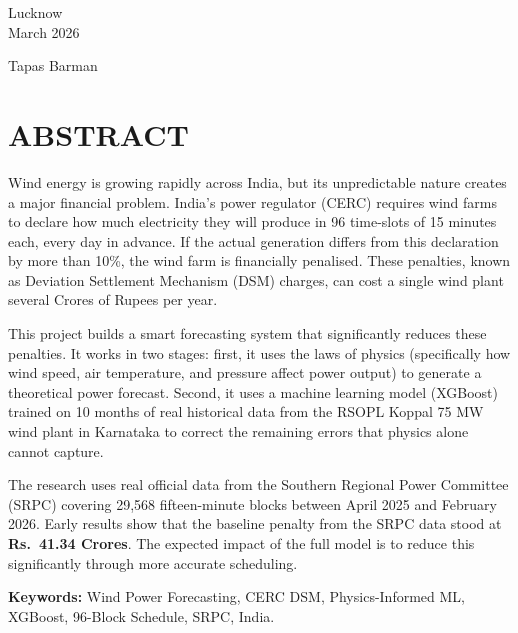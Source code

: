 \documentclass[12pt,a4paper]{report}
\begin{document}
\vfill

\noindent
\begin{minipage}[t]{0.48\textwidth}
    Lucknow\\
    March 2026
\end{minipage}
\hfill
\begin{minipage}[t]{0.48\textwidth}
    \raggedleft
    Tapas Barman
\end{minipage}

\chapter*{ABSTRACT}

Wind energy is growing rapidly across India, but its unpredictable nature creates a major financial problem. India's power regulator (CERC) requires wind farms to declare how much electricity they will produce in 96 time-slots of 15 minutes each, every day in advance. If the actual generation differs from this declaration by more than 10\%, the wind farm is financially penalised. These penalties, known as Deviation Settlement Mechanism (DSM) charges, can cost a single wind plant several Crores of Rupees per year.

This project builds a smart forecasting system that significantly reduces these penalties. It works in two stages: first, it uses the laws of physics (specifically how wind speed, air temperature, and pressure affect power output) to generate a theoretical power forecast. Second, it uses a machine learning model (XGBoost) trained on 10 months of real historical data from the RSOPL Koppal 75 MW wind plant in Karnataka to correct the remaining errors that physics alone cannot capture.

The research uses real official data from the Southern Regional Power Committee (SRPC) covering 29,568 fifteen-minute blocks between April 2025 and February 2026. Early results show that the baseline penalty from the SRPC data stood at \textbf{Rs.\ 41.34 Crores}. The expected impact of the full model is to reduce this significantly through more accurate scheduling.

\vspace{0.5em}
\noindent\textbf{Keywords:} Wind Power Forecasting, CERC DSM, Physics-Informed ML, XGBoost, 96-Block Schedule, SRPC, India.

\tableofcontents
\listoftables
\end{document}
